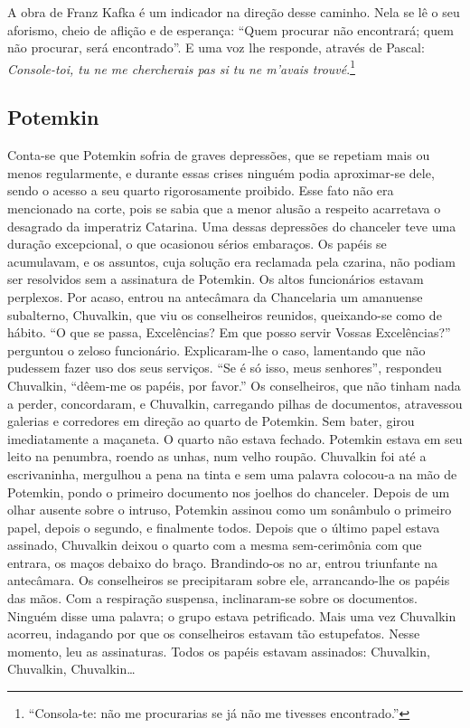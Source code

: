 A obra de Franz Kafka é um indicador
na direção desse caminho. Nela se lê o
seu aforismo, cheio de aflição e de esperança: ``Quem procurar não
encontrará; quem não procurar, será encontrado''. E uma voz lhe responde, através de Pascal:
\textit{Console-toi, tu ne me chercherais pas si tu ne m'avais trouvé}.\footnote{``Consola-te: não me procurarias se já não me tivesses encontrado.''}




\subsection{Potemkin}

Conta-se que Potemkin sofria de graves depressões, que se repetiam mais
ou menos regularmente, e durante essas crises ninguém podia aproximar-se
dele, sendo o acesso a seu quarto rigorosamente proibido. Esse fato não
era mencionado na corte, pois se sabia que a menor alusão a respeito
acarretava o desagrado da imperatriz Catarina. Uma dessas depressões do
chanceler teve uma duração excepcional, o que ocasionou sérios
embaraços. Os papéis se acumulavam, e os assuntos, cuja solução era
reclamada pela czarina, não podiam ser resolvidos sem a assinatura de
Potemkin. Os altos funcionários estavam perplexos. Por acaso, entrou na
antecâmara da Chancelaria um amanuense subalterno, Chuvalkin, que viu os
conselheiros reunidos, queixando-se como de hábito. ``O que se passa,
Excelências? Em que posso servir Vossas Excelências?'' perguntou o
zeloso funcionário. Explicaram-lhe o caso, lamentando que não pudessem
fazer uso dos seus serviços. ``Se é só isso, meus senhores'', respondeu
Chuvalkin, ``dêem-me os papéis, por favor.'' Os conselheiros, que não
tinham nada a perder, concordaram, e Chuvalkin, carregando pilhas de
documentos, atravessou galerias e corredores em direção ao quarto de
Potemkin. Sem bater, girou imediatamente a maçaneta. O quarto não estava
fechado. Potemkin estava em seu leito na penumbra, roendo as unhas, num
velho roupão. Chuvalkin foi até a escrivaninha, mergulhou a pena na
tinta e sem uma palavra colocou-a na mão de Potemkin, pondo o primeiro
documento nos joelhos do chanceler. Depois de um olhar ausente sobre o
intruso, Potemkin assinou como um sonâmbulo o primeiro papel, depois o
segundo, e finalmente todos. Depois que o último papel estava assinado,
Chuvalkin deixou o quarto com a mesma sem-cerimônia com que entrara, os
maços debaixo do braço. Brandindo-os no ar, entrou triunfante na
antecâmara. Os conselheiros se precipitaram sobre ele, arrancando-lhe os
papéis das mãos. Com a respiração suspensa, inclinaram-se sobre os
documentos. Ninguém disse uma palavra; o grupo estava petrificado. Mais
uma vez Chuvalkin acorreu, indagando por que os conselheiros estavam tão
estupefatos. Nesse momento, leu as assinaturas. Todos os papéis estavam
assinados: Chuvalkin, Chuvalkin, Chuvalkin\ldots{}

